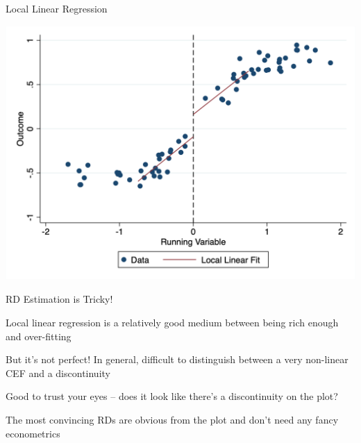 \documentclass[11pt,english,handout]{beamer}
\newenvironment{wideitemize}{\itemize\addtolength{\itemsep}{10pt}}{\enditemize}
\begin{document}
\begin{frame}{Local Linear Regression}
	\begin{center}
	\includegraphics[width = 0.8 \linewidth]{rd_llin}
	\end{center}
\end{frame}

\begin{frame}{RD Estimation is Tricky!}
	\begin{wideitemize}
		\item
		Local linear regression is a relatively good medium between being rich enough and over-fitting
		
		\item
		But it's not perfect! In general, difficult to distinguish between a very non-linear CEF and a discontinuity
		
		\pause
		\item
		Good to trust your eyes -- does it look like there's a discontinuity on the plot?
		

		\item
		The most convincing RDs are obvious from the plot and don't need any fancy econometrics
	\end{wideitemize}
\end{frame}


	
	
\end{document}
